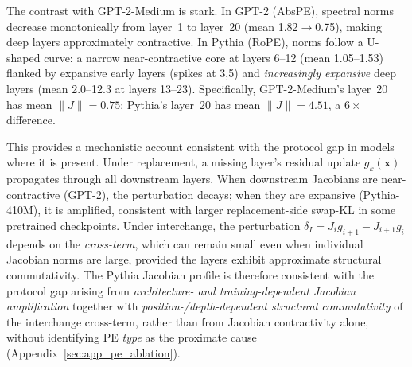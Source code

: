 \documentclass{article}
\begin{document}
The contrast with GPT-2-Medium is stark. In GPT-2 (AbsPE), spectral norms decrease monotonically from layer~1 to layer~20 (mean 1.82$\to$0.75), making deep layers approximately contractive. In Pythia (RoPE), norms follow a U-shaped curve: a narrow near-contractive core at layers 6--12 (mean 1.05--1.53) flanked by expansive early layers (spikes at 3,5) and \emph{increasingly expansive} deep layers (mean 2.0--12.3 at layers 13--23). Specifically, GPT-2-Medium's layer~20 has mean $\|J\|{=}0.75$; Pythia's layer~20 has mean $\|J\|{=}4.51$, a $6\times$ difference.

This provides a mechanistic account consistent with the protocol gap in models where it is present. Under replacement, a missing layer's residual update $g_k(\mathbf{x})$ propagates through all downstream layers. When downstream Jacobians are near-contractive (GPT-2), the perturbation decays; when they are expansive (Pythia-410M), it is amplified, consistent with larger replacement-side swap-KL in some pretrained checkpoints. Under interchange, the perturbation $\delta_I = J_i g_{i+1} - J_{i+1} g_i$ depends on the \emph{cross-term}, which can remain small even when individual Jacobian norms are large, provided the layers exhibit approximate structural commutativity. The Pythia Jacobian profile is therefore consistent with the protocol gap arising from \emph{architecture- and training-dependent Jacobian amplification} together with \emph{position-/depth-dependent structural commutativity} of the interchange cross-term, rather than from Jacobian contractivity alone, without identifying PE \emph{type} as the proximate cause (Appendix~\ref{sec:app_pe_ablation}).
\end{document}

